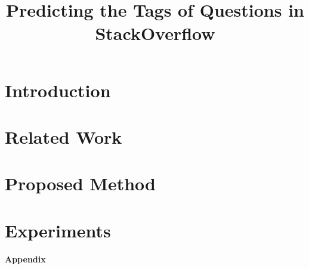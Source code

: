 \documentclass{article} %
\title{Predicting the Tags of Questions in StackOverflow}
\begin{document}
\maketitle


\section{Introduction}


\section{Related Work}


\section{Proposed Method}


\section{Experiments}


\small{


}

\large
\textbf{Appendix}
\normalsize


\end{document}
